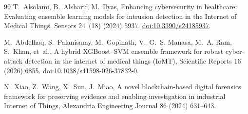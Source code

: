 \documentclass[preprint,12pt]{elsarticle}
\begin{document}
\begin{thebibliography}{99}
 T.~Alsolami, B.~Alsharif, M.~Ilyas, Enhancing cybersecurity in healthcare: Evaluating ensemble learning models for intrusion detection in the Internet of Medical Things, Sensors 24~(18) (2024) 5937. \href{https://doi.org/10.3390/s24185937}{doi:10.3390/s24185937}.

 M.~Abdelhaq, S.~Palanisamy, M.~Gopinath, V.~G.~S. Manasa, M.~A. Ram, S.~Khan, et~al., A hybrid XGBoost--SVM ensemble framework for robust cyber-attack detection in the internet of medical things (IoMT), Scientific Reports 16 (2026) 6855. \href{https://doi.org/10.1038/s41598-026-37832-0}{doi:10.1038/s41598-026-37832-0}. %

 N.~Xiao, Z.~Wang, X.~Sun, J.~Miao, A novel blockchain-based digital forensics framework for preserving evidence and enabling investigation in industrial Internet of Things, Alexandria Engineering Journal 86 (2024) 631--643. %

\end{thebibliography}
\end{document}

